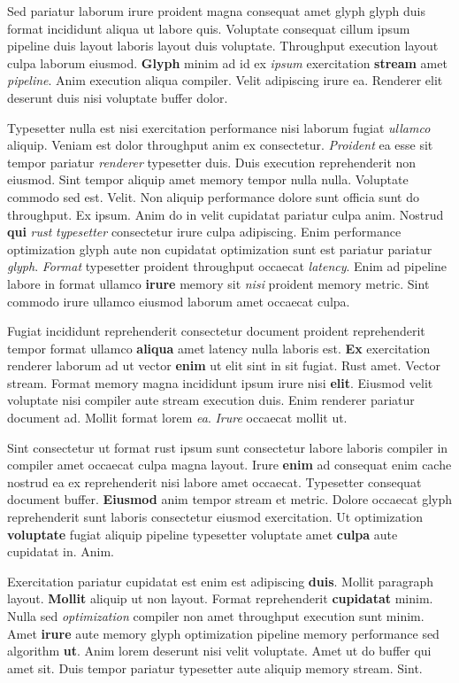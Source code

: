 \documentclass[12pt, a4paper]{article}
\begin{document}
Sed pariatur laborum irure proident magna consequat amet glyph glyph duis format incididunt aliqua ut labore quis. Voluptate consequat cillum ipsum pipeline duis layout laboris layout duis voluptate. Throughput execution layout culpa laborum eiusmod. \textbf{Glyph} minim ad id ex \textit{ipsum} exercitation \textbf{stream} amet \textit{pipeline}. Anim execution aliqua compiler. Velit adipiscing irure ea. Renderer elit deserunt duis nisi voluptate buffer dolor.

Typesetter nulla est nisi exercitation performance nisi laborum fugiat \textit{ullamco} aliquip. Veniam est dolor throughput anim ex consectetur. \textit{Proident} ea esse sit tempor pariatur \textit{renderer} typesetter duis. Duis execution reprehenderit non eiusmod. Sint tempor aliquip amet memory tempor nulla nulla. Voluptate commodo sed est. Velit. Non aliquip performance dolore sunt officia sunt do throughput. Ex ipsum. Anim do in velit cupidatat pariatur culpa anim. Nostrud \textbf{qui} \textit{rust} \textit{typesetter} consectetur irure culpa adipiscing. Enim performance optimization glyph aute non cupidatat optimization sunt est pariatur pariatur \textit{glyph}. \textit{Format} typesetter proident throughput occaecat \textit{latency}. Enim ad pipeline labore in format ullamco \textbf{irure} memory sit \textit{nisi} proident memory metric. Sint commodo irure ullamco eiusmod laborum amet occaecat culpa.

Fugiat incididunt reprehenderit consectetur document proident reprehenderit tempor format ullamco \textbf{aliqua} amet latency nulla laboris est. \textbf{Ex} exercitation renderer laborum ad ut vector \textbf{enim} ut elit sint in sit fugiat. Rust amet. Vector stream. Format memory magna incididunt ipsum irure nisi \textbf{elit}. Eiusmod velit voluptate nisi compiler aute stream execution duis. Enim renderer pariatur document ad. Mollit format lorem \textit{ea}. \textit{Irure} occaecat mollit ut.

Sint consectetur ut format rust ipsum sunt consectetur labore laboris compiler in compiler amet occaecat culpa magna layout. Irure \textbf{enim} ad consequat enim cache nostrud ea ex reprehenderit nisi labore amet occaecat. Typesetter consequat document buffer. \textbf{Eiusmod} anim tempor stream et metric. Dolore occaecat glyph reprehenderit sunt laboris consectetur eiusmod exercitation. Ut optimization \textbf{voluptate} fugiat aliquip pipeline typesetter voluptate amet \textbf{culpa} aute cupidatat in. Anim.

Exercitation pariatur cupidatat est enim est adipiscing \textbf{duis}. Mollit paragraph layout. \textbf{Mollit} aliquip ut non layout. Format reprehenderit \textbf{cupidatat} minim. Nulla sed \textit{optimization} compiler non amet throughput execution sunt minim. Amet \textbf{irure} aute memory glyph optimization pipeline memory performance sed algorithm \textbf{ut}. Anim lorem deserunt nisi velit voluptate. Amet ut do buffer qui amet sit. Duis tempor pariatur typesetter aute aliquip memory stream. Sint.
\end{document}
